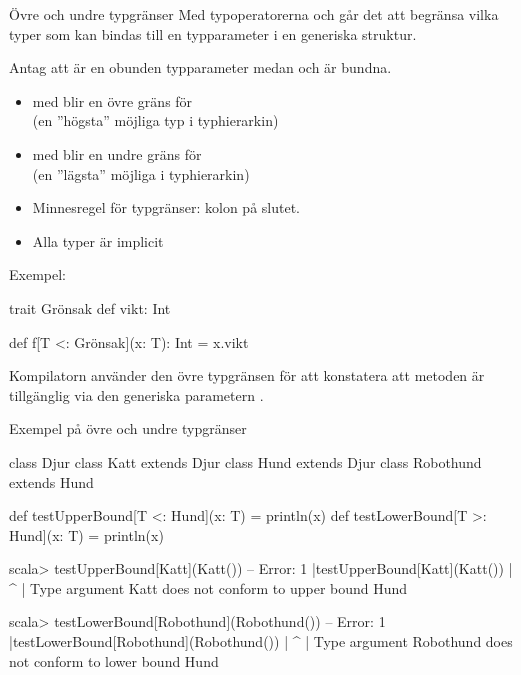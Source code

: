 \begin{Slide}{Övre och undre typgränser}\SlideFontSmall
Med typoperatorerna \code{<:} och \code{>:} går det att begränsa vilka typer som kan bindas till en typparameter i en generiska struktur. 

\vspace{0.5em}Antag att  är en obunden typparameter medan  och  är bundna. 
\begin{itemize}
  \item med  blir  en övre gräns  för \\(en ''högsta'' möjliga typ i  typhierarkin) 
  \item med  blir  en undre gräns  för \\(en ''lägsta'' möjliga i  typhierarkin) 
  \item Minnesregel för typgränser: kolon på slutet.
  \item Alla typer  är implicit 
\end{itemize} 
\pause

\vspace{0.5em}Exempel: 
\begin{Code}
  trait Grönsak { def vikt: Int }

  def f[T <: Grönsak](x: T): Int = x.vikt
\end{Code}

Kompilatorn använder den övre typgränsen för att konstatera att metoden  är tillgänglig via den generiska parametern .

\end{Slide}

\begin{Slide}{Exempel på övre och undre typgränser}

\begin{Code}
class Djur
class Katt extends Djur 
class Hund extends Djur
class Robothund extends Hund

def testUpperBound[T <: Hund](x: T) = println(x)
def testLowerBound[T >: Hund](x: T) = println(x)
\end{Code}

\begin{REPL}
scala> testUpperBound[Katt](Katt())
-- Error:
1 |testUpperBound[Katt](Katt())
  |          ^
  |          Type argument Katt does not conform to upper bound Hund

scala> testLowerBound[Robothund](Robothund())
-- Error:
1 |testLowerBound[Robothund](Robothund())
  |          ^
  |          Type argument Robothund does not conform to lower bound Hund
\end{REPL}

\end{Slide}

